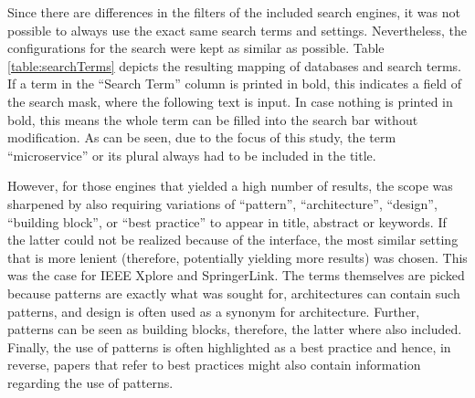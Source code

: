 \documentclass[conference]{IEEEtran}
\begin{document}
Since there are differences in the filters of the included search engines, it was not possible to always use the exact same search terms and settings. Nevertheless, the configurations for the search were kept as similar as possible. Table \ref{table:searchTerms} depicts the resulting mapping of databases and search terms. If a term in the “Search Term” column is printed in bold, this indicates a field of the search mask, where the following text is input. In case nothing is printed in bold, this means the whole term can be filled into the search bar without modification. As can be seen, due to the focus of this study, the term “microservice” or its plural always had to be included in the title.

However, for those engines that yielded a high number of results, the scope was sharpened by also requiring variations of “pattern”, “architecture”, “design”, “building block”, or “best practice” to appear in title, abstract or keywords. If the latter could not be realized because of the interface, the most similar setting that is more lenient (therefore, potentially yielding more results) was chosen. This was the case for IEEE Xplore and SpringerLink. The terms themselves are picked because patterns are exactly what was sought for, architectures can contain such patterns, and design is often used as a synonym for architecture. Further, patterns can be seen as building blocks, therefore, the latter where also included. Finally, the use of patterns is often highlighted as a best practice and hence, in reverse, papers that refer to best practices might also contain information regarding the use of patterns. 
\end{document}
